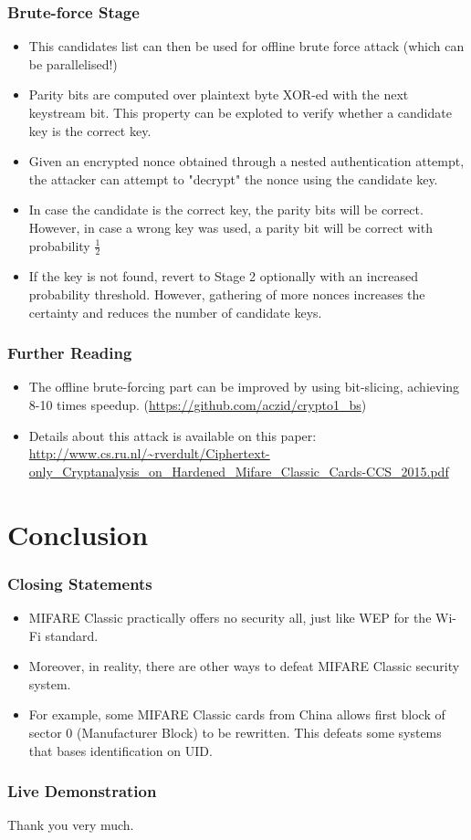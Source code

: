\documentclass[12pt]{beamer}
\begin{document}
\begin{frame}
\frametitle{Brute-force Stage}
\begin{itemize}
	\item This candidates list can then be used for offline brute force attack (which can be parallelised!)
	\item Parity bits are computed over plaintext byte XOR-ed with the next keystream bit. This property can be exploted to verify whether a candidate key is the correct key.
	\item Given an encrypted nonce obtained through
	a nested authentication attempt, the attacker can attempt to "decrypt" the nonce using the candidate key.
	\item In case the candidate is the correct key, the parity bits will be correct. However, in case a wrong key was used, a parity bit will be
	correct with probability $\frac{1}{2}$
	\item If the key is not found, revert to Stage 2 optionally with an increased probability threshold. However, gathering of more nonces increases the certainty and reduces the number of candidate keys.
\end{itemize}
\end{frame}

\begin{frame}
\frametitle{Further Reading}
\begin{itemize}
	\item The offline brute-forcing part can be improved by using bit-slicing, achieving 8-10 times speedup. (\url{https://github.com/aczid/crypto1_bs})
	\item Details about this attack is available on this paper: \url{http://www.cs.ru.nl/~rverdult/Ciphertext-only_Cryptanalysis_on_Hardened_Mifare_Classic_Cards-CCS_2015.pdf}
\end{itemize}
\end{frame}

\section{Conclusion}
\begin{frame}
\frametitle{Closing Statements}
\begin{itemize}
	\item MIFARE Classic practically offers no security all, just like WEP for the Wi-Fi standard.
	\item Moreover, in reality, there are other ways to defeat MIFARE Classic security system.
	\item For example, some MIFARE Classic cards from China allows first block of sector 0 (Manufacturer Block) to be rewritten. This defeats some systems that bases identification on UID.
\end{itemize}
\end{frame}

\begin{frame}
\frametitle{Live Demonstration}
\begin{center}
  Thank you very much.
\end{center}
\end{frame}
\end{document}
